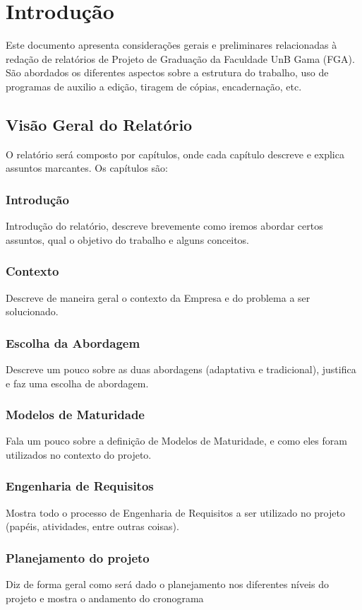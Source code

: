 \chapter[Introdução]{Introdução}

Este documento apresenta considerações gerais e preliminares relacionadas
à redação de relatórios de Projeto de Graduação da Faculdade UnB Gama
(FGA). São abordados os diferentes aspectos sobre a estrutura do trabalho,
uso de programas de auxilio a edição, tiragem de cópias, encadernação, etc.

\section{Visão Geral do Relatório}
O relatório será composto por capítulos, onde cada capítulo descreve e explica assuntos marcantes. Os capítulos são:

\subsection{Introdução}
Introdução do relatório, descreve brevemente como iremos abordar certos assuntos, qual o objetivo do trabalho e alguns conceitos.
\subsection{Contexto}
Descreve de maneira geral o contexto da Empresa e do problema a ser solucionado.
\subsection{Escolha da Abordagem}
Descreve um pouco sobre as duas abordagens (adaptativa e tradicional), justifica e faz uma escolha de abordagem.
\subsection{Modelos de Maturidade}
Fala um pouco sobre a definição de Modelos de Maturidade, e como eles foram utilizados no contexto do projeto.
\subsection{Engenharia de Requisitos}
Mostra todo o processo de Engenharia de Requisitos a ser utilizado no projeto (papéis, atividades, entre outras coisas).
\subsection{Planejamento do projeto}
Diz de forma geral como será dado o planejamento nos diferentes níveis do projeto e mostra o andamento do cronograma
